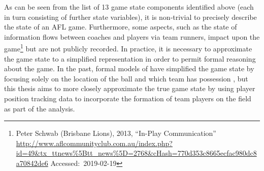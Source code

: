 As can be seen from the list of 13 game state components identified above (each in turn consisting of further state variables), it is non-trivial to precisely describe the state of an AFL game. Furthermore, some aspects, such as the state of information flows between coaches and players via team runners, impact upon the game\footnote{Peter Schwab (Brisbane Lions), 2013, ``In-Play Communication'' \url{http://www.aflcommunityclub.com.au/index.php?id=49&tx_ttnews\%5Btt_news\%5D=2768\&cHash=770d353c8665ecfac980dc8a70842de6} Accessed:~2019-02-19} but are not publicly recorded. In practice, it is necessary to approximate the game state to a simplified representation in order to permit formal reasoning about the game. In the past, formal models of \afl{} have simplified the game state by focusing solely on the location of the ball and which team has possession \cite{oshaughnessy_possession_2006, Jackson2016}, but this thesis aims to more closely approximate the true game state by using player position tracking data to incorporate the formation of team players on the field as part of the analysis.
